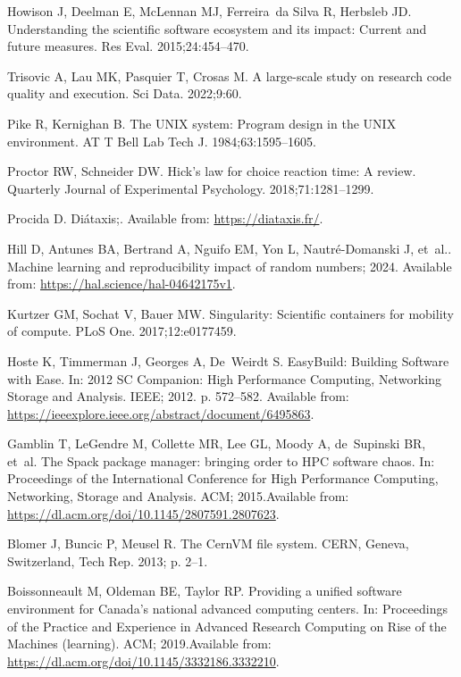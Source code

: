 \documentclass[11pt]{article}
\begin{document}
\begin{thebibliography}{10}
Howison J, Deelman E, McLennan MJ, Ferreira~da Silva R, Herbsleb JD.
\newblock Understanding the scientific software ecosystem and its impact:
  Current and future measures.
\newblock Res Eval. 2015;24:454--470.

Trisovic A, Lau MK, Pasquier T, Crosas M.
\newblock A large-scale study on research code quality and execution.
\newblock Sci Data. 2022;9:60.

Pike R, Kernighan B.
\newblock The {UNIX} system: Program design in the {UNIX} environment.
\newblock AT T Bell Lab Tech J. 1984;63:1595--1605.

Proctor RW, Schneider DW.
\newblock Hick’s law for choice reaction time: A review.
\newblock Quarterly Journal of Experimental Psychology. 2018;71:1281--1299.

Procida D. Diátaxis;.
\newblock Available from: \url{https://diataxis.fr/}.

Hill D, Antunes BA, Bertrand A, Nguifo EM, Yon L, Nautré-Domanski J, et~al..
  Machine learning and reproducibility impact of random numbers; 2024.
\newblock Available from: \url{https://hal.science/hal-04642175v1}.

Kurtzer GM, Sochat V, Bauer MW.
\newblock Singularity: Scientific containers for mobility of compute.
\newblock PLoS One. 2017;12:e0177459.

Hoste K, Timmerman J, Georges A, De~Weirdt S.
\newblock EasyBuild: Building Software with Ease.
\newblock In: 2012 SC Companion: High Performance Computing, Networking Storage
  and Analysis. IEEE; 2012. p. 572--582.
\newblock Available from:
  \url{https://ieeexplore.ieee.org/abstract/document/6495863}.

Gamblin T, LeGendre M, Collette MR, Lee GL, Moody A, de~Supinski BR, et~al.
\newblock The Spack package manager: bringing order to {HPC} software chaos.
\newblock In: Proceedings of the International Conference for High Performance
  Computing, Networking, Storage and Analysis. ACM; 2015.Available from:
  \url{https://dl.acm.org/doi/10.1145/2807591.2807623}.

Blomer J, Buncic P, Meusel R.
\newblock The {CernVM} file system.
\newblock CERN, Geneva, Switzerland, Tech Rep. 2013; p. 2--1.

Boissonneault M, Oldeman BE, Taylor RP.
\newblock Providing a unified software environment for Canada's national
  advanced computing centers.
\newblock In: Proceedings of the Practice and Experience in Advanced Research
  Computing on Rise of the Machines (learning). ACM; 2019.Available from:
  \url{https://dl.acm.org/doi/10.1145/3332186.3332210}.


\end{thebibliography}
\end{document}
